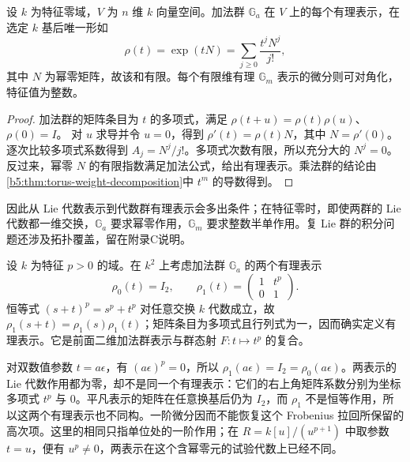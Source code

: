 \begin{proposition}\label{b5:prop:additive-rational-representations}
	设 \(k\) 为特征零域，\(V\) 为 \(n\) 维 \(k\) 向量空间。加法群 \(\mathbb G_a\) 在 \(V\) 上的每个有理表示，在选定 \(k\) 基后唯一形如
	\[
		\rho(t)=\exp(tN)=\sum_{j\ge0}\frac{t^jN^j}{j!},
	\]
	其中 \(N\) 为幂零矩阵，故该和有限。每个有限维有理 \(\mathbb G_m\) 表示的微分则可对角化，特征值为整数。
\end{proposition}
\begin{proof}
	加法群的矩阵条目为 \(t\) 的多项式，满足 \(\rho(t+u)=\rho(t)\rho(u)\)、\(\rho(0)=I\)。 对 \(u\) 求导并令 \(u=0\)，得到 \(\rho'(t)=\rho(t)N\)，其中 \(N=\rho'(0)\)。逐次比较多项式系数得到 \(A_j=N^j/j!\)。多项式次数有限，所以充分大的 \(N^j=0\)。反过来，幂零 \(N\) 的有限指数满足加法公式，给出有理表示。乘法群的结论由\cref{b5:thm:torus-weight-decomposition}中 \(t^m\) 的导数得到。
\end{proof}
因此从 Lie 代数表示到代数群有理表示会多出条件；在特征零时，即使两群的 Lie 代数都一维交换，\(\mathbb G_a\) 要求幂零作用，\(\mathbb G_m\) 要求整数半单作用。复 Lie 群的积分问题还涉及拓扑覆盖，留在附录C说明。
\begin{example}\label{b5:exm:frobenius-rational-representation}
	设 \(k\) 为特征 \(p>0\) 的域。在 \(k^2\) 上考虑加法群 \(\mathbb G_a\) 的两个有理表示
	\[
		\rho_0(t)=I_2,\qquad
		\rho_1(t)=\begin{pmatrix}1&t^p\\0&1\end{pmatrix}.
	\]
	恒等式 \((s+t)^p=s^p+t^p\) 对任意交换 \(k\) 代数成立，故 \(\rho_1(s+t)=\rho_1(s)\rho_1(t)\)；矩阵条目为多项式且行列式为一，因而确实定义有理表示。它是前面二维加法群表示与群态射 \(F:t\mapsto t^p\) 的复合。

	对双数值参数 \(t=a\epsilon\)，有 \((a\epsilon)^p=0\)，所以 \(\rho_1(a\epsilon)=I_2=\rho_0(a\epsilon)\)。两表示的 Lie 代数作用都为零，却不是同一个有理表示：它们的右上角矩阵系数分别为坐标多项式 \(t^p\) 与 \(0\)。平凡表示的矩阵在任意换基后仍为 \(I_2\)，而 \(\rho_1\) 不是恒等作用，所以这两个有理表示也不同构。一阶微分因而不能恢复这个 Frobenius 拉回所保留的高次项。这里的相同只指单位处的一阶作用；在 \(R=k[u]/(u^{p+1})\) 中取参数 \(t=u\)，便有 \(u^p\ne0\)，两表示在这个含幂零元的试验代数上已经不同。
\end{example}
